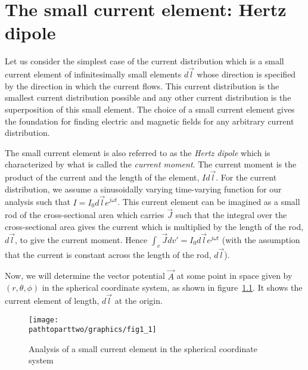 \chapter{The small current element: Hertz dipole}
Let us consider the simplest case of the current distribution which is a small current element of infinitesimally small elements $d\vec{l}$ whose direction is specified by the direction in which the current flows. This current distribution is the smallest current distribution possible and any other current distribution is the superposition of this small element. The choice of a small current element gives the foundation for finding electric and magnetic fields for any arbitrary current distribution.

The small current element is also referred to as the \emph{Hertz dipole} which is characterized by what is called the \emph{current moment}. The current moment is the product of the current and the length of the element, $Id\vec{l}$. For the current distribution, we assume a sinusoidally varying time-varying function for our analysis such that $I = I_0d\vec{l}e^{j\omega t}$. This current element can be imagined as a small rod of the cross-sectional area which carries $\vec{J}$ such that the integral over the cross-sectional area gives the current which is multiplied by the length of the rod, $d\vec{l}$, to give the current moment. Hence $\int_v\vec{J}dv' = I_0d\vec{l}e^{j\omega t}$ (with the assumption that the current is constant across the length of the rod, $d\vec{l}$). 

Now, we will determine the vector potential $\vec{A}$ at some point in space given by $(r, \theta, \phi)$ in the spherical coordinate system, as shown in figure~\ref{fig:small_current_element}. It shows the current element of length, $d\vec{l}$ at the origin.
\begin{figure}[h]
\texttt{[image: \\pathtoparttwo/graphics/fig1\_1]}
\centering
\caption{Analysis of a small current element in the spherical coordinate system}
\label{fig:small_current_element}
\end{figure}

